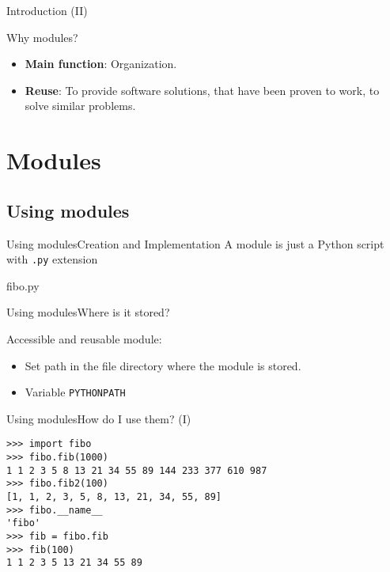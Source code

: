 \documentclass[10pt,compress]{beamer} %
\begin{document}
\begin{frame}{Introduction (II)}
		\begin{block}{Why modules?}
			\begin{itemize}
			\item \textbf{Main function}: Organization.
			\item \textbf{Reuse}: To provide software solutions, that have been proven to work, to solve similar problems.
			\end{itemize}
		\end{block}
		
\end{frame}

\section{Modules}

\subsection{Using modules}
\begin{frame}{Using modules}{Creation and Implementation}
	\vspace{-0.2cm}
	A module is just a Python script with \texttt{.py} extension
	\vspace{-0.2cm}
	\begin{exampleblock}{fibo.py}
	\vspace{-0.2cm}
	
	\vspace{-0.2cm}
	\end{exampleblock}
\end{frame}

\begin{frame}{Using modules}{Where is it stored?}

 Accessible and reusable module:
 \begin{itemize}
 \item  Set path in the file directory where the module is stored.
 \item Variable \texttt{PYTHONPATH}
 \end{itemize}
 \end{frame}
 
\begin{frame}[fragile]{Using modules}{How do I use them? (I)}
	\begin{block}{}
	\begin{verbatim}
>>> import fibo
>>> fibo.fib(1000)
1 1 2 3 5 8 13 21 34 55 89 144 233 377 610 987
>>> fibo.fib2(100)
[1, 1, 2, 3, 5, 8, 13, 21, 34, 55, 89]
>>> fibo.__name__
'fibo'
>>> fib = fibo.fib
>>> fib(100)
1 1 2 3 5 13 21 34 55 89
\end{verbatim}
	\vspace{-0.2cm}
	\end{block}
\end{frame}
\end{document}
